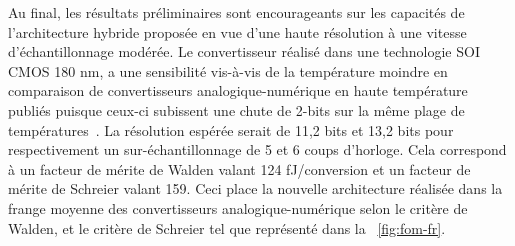 \begin{mdframed}[linecolor=Prune,linewidth=1]
    Au final, les résultats préliminaires sont encourageants sur les capacités de l'architecture hybride proposée en vue d'une haute résolution à une vitesse d'échantillonnage modérée. Le convertisseur réalisé dans une technologie SOI CMOS 180 nm, a une sensibilité vis-à-vis de la température moindre en comparaison de convertisseurs analogique-numérique en haute température publiés puisque ceux-ci subissent une chute de 2-bits sur la même plage de températures~\cite{Ericson2004}. La résolution espérée serait de 11,2 bits et 13,2 bits pour respectivement un sur-échantillonnage de 5 et 6 coups d'horloge. Cela correspond à un facteur de mérite de Walden valant 124 fJ/conversion et un facteur de mérite de Schreier valant 159. Ceci place la nouvelle architecture réalisée dans la frange moyenne des convertisseurs analogique-numérique selon le critère de Walden, et le critère de Schreier tel que représenté dans la \figurename~\ref{fig:fom-fr}.
    

\end{mdframed}
